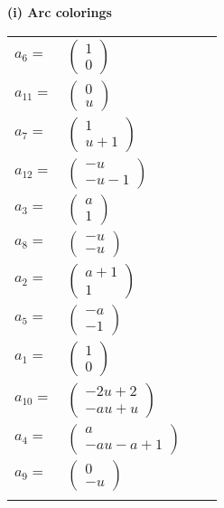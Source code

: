 \documentclass[1p]{elsarticle_modified}
\theoremstyle{definition}
\begin{document}
\flushleft \textbf{(i) Arc colorings}\\
\begin{tabular}{m{7pt} m{180pt} m{7pt} m{180pt} }
\flushright $a_{6}=$&$\begin{pmatrix}1\\0\end{pmatrix}$ \\
\flushright $a_{11}=$&$\begin{pmatrix}0\\u\end{pmatrix}$ \\
\flushright $a_{7}=$&$\begin{pmatrix}1\\u+1\end{pmatrix}$ \\
\flushright $a_{12}=$&$\begin{pmatrix}- u\\- u-1\end{pmatrix}$ \\
\flushright $a_{3}=$&$\begin{pmatrix}a\\1\end{pmatrix}$ \\
\flushright $a_{8}=$&$\begin{pmatrix}- u\\- u\end{pmatrix}$ \\
\flushright $a_{2}=$&$\begin{pmatrix}a+1\\1\end{pmatrix}$ \\
\flushright $a_{5}=$&$\begin{pmatrix}- a\\-1\end{pmatrix}$ \\
\flushright $a_{1}=$&$\begin{pmatrix}1\\0\end{pmatrix}$ \\
\flushright $a_{10}=$&$\begin{pmatrix}-2 u+2\\- a u+u\end{pmatrix}$ \\
\flushright $a_{4}=$&$\begin{pmatrix}a\\- a u- a+1\end{pmatrix}$ \\
\flushright $a_{9}=$&$\begin{pmatrix}0\\- u\end{pmatrix}$\\&\end{tabular}
\end{document}
